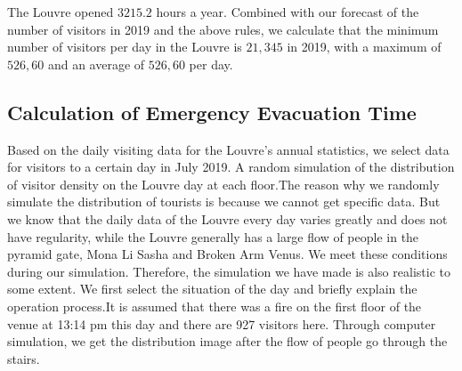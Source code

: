 
The Louvre opened $3215.2$ hours a year. Combined with our forecast of the number of visitors in 2019 and the above rules, we calculate that the minimum number of visitors per day in the Louvre is \textbf{$21,345$} in 2019, with a maximum of \textbf{$526,60$} and an average of \textbf{$526,60$} per day.

\subsection{Calculation of Emergency Evacuation Time}
Based on the daily visiting data for the Louvre's annual statistics, we select data for visitors to a certain day in July 2019. A random simulation of the distribution of visitor density on the Louvre day at each floor.The reason why we randomly simulate the distribution of tourists is because we cannot get specific data. But we know that the daily data of the Louvre every day varies greatly and does not have regularity, while the Louvre generally has a large flow of people in the pyramid gate, Mona Li Sasha and Broken Arm Venus. We meet these conditions during our simulation. Therefore, the simulation we have made is also realistic to some extent.
We first select the situation of the day and briefly explain the operation process.It is assumed that there was a fire on the first floor of the venue at 13:14 pm this day and there are 927 visitors here. Through computer simulation, we get the distribution image after the flow of people go through the stairs.
